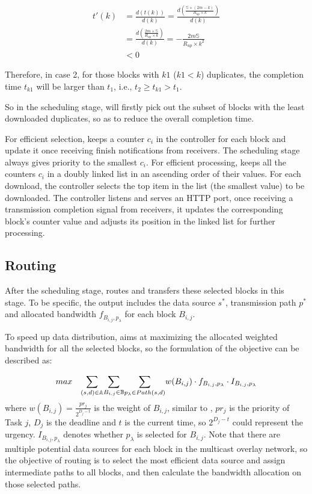 \begin{equation}
\label{calculus}
\begin{split}
t'(k) &= \frac{d(t(k))}{d(k)} = \frac{d(\frac{\mathbb{S}\times (2m-k)}{R_{up}\times k})}{d(k)} \\
    &= \frac{d(\frac{2m\times \mathbb{S}}{R_{up}\times k})}{d(k)} = -\frac{2m\mathbb{S}}{R_{up}\times k^2} \\
    &< 0
\end{split}
\end{equation}

Therefore, in case 2, for those blocks with $k1$ ($k1<k$) duplicates, the completion time $t_{k1}$ will be larger than $t_1$, i.e., $t_2 \geq t_{k1} > t_1$.

So in the scheduling stage, \name will firstly pick out the subset of blocks with the least downloaded duplicates, so as to reduce the overall completion time.

For efficient selection, \name keeps a counter $c_i$ in the controller for each block and update it once receiving finish notifications from receivers. The scheduling stage always gives priority to the smallest $c_i$. For efficient processing, \name keeps all the counters $c_i$ in a doubly linked list in an ascending order of their values. For each download, the controller selects the top item in the list (the smallest value) to be downloaded. The controller listens and serves an HTTP port, once receiving a transmission completion signal from receivers, it updates the corresponding block's counter value and adjusts its position in the linked list for further processing.

\subsection{Routing}
After the scheduling stage, \name routes and transfers these selected blocks in this stage. To be specific, the output includes the data source $s^*$, transmission path $p^*$ and allocated bandwidth $f_{B_{i,j},p_\lambda}$ for each block $B_{i,j}$.

To speed up data distribution, \name aims at maximizing the allocated weighted bandwidth for all the selected blocks, so the formulation of the objective can be described as:

\begin{equation}
\centering
max \quad \displaystyle{\sum_{(s,d)\in \mathbb{A}}} \displaystyle{\sum_{B_{i,j} \in \mathbb{B}}} \displaystyle{\sum_{p_{\lambda}\in Path(s,d)}} w(B_{i,j})\cdot f_{B_{i,j},p_\lambda} \cdot I_{B_{i,j},p_\lambda}
\end{equation}
where $w(B_{i,j}) = \frac{pr_j}{2^{D_j-t}}$ is the weight of $B_{i,j}$, similar to \cite{zhang2015guaranteeing}, $pr_j$ is the priority of Task $j$, $D_j$ is the deadline and $t$ is the current time, so $2^{D_j-t}$ could represent the urgency. $I_{B_{i,j},p_\lambda}$ denotes whether $p_\lambda$ is selected for $B_{i,j}$. Note that there are multiple potential data sources for each block in the multicast overlay network, so the objective of routing is to select the most efficient data source and assign intermediate paths to all blocks, and then calculate the bandwidth allocation on those selected paths.

